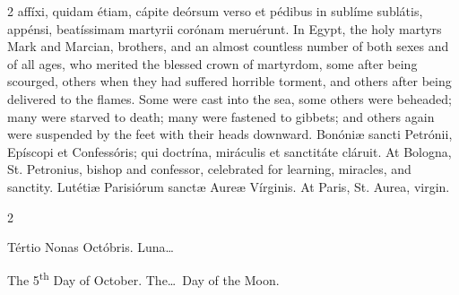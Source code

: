 \begin{paracol}{2}
 affíxi, quidam étiam, cápite deórsum verso et pédibus in sublíme sublátis, 
 appénsi, beatíssimam martyrii corónam meruérunt.
\switchcolumn
{}
In Egypt, the holy martyrs Mark and 
 Marcian, brothers, and an almost countless number of both sexes and of all 
 ages, who merited the blessed crown of martyrdom, some after being scourged, 
 others when they had suffered horrible torment, and others after being 
 delivered to the flames. Some were cast into the sea, some others were 
 beheaded; many were starved to death; many were fastened to gibbets; and 
 others again were suspended by the feet with their heads downward.
\switchcolumn*
{}
Bonóniæ sancti Petrónii, 
 Epíscopi et Confessóris; qui doctrína, miráculis et sanctitáte cláruit.
\switchcolumn
{}
At Bologna, St. Petronius, bishop 
 and confessor, celebrated for learning, miracles, and sanctity.
\switchcolumn*
{}
Lutétiæ Parisiórum 
 sanctæ Aureæ Vírginis.
\switchcolumn
{}
At Paris, St. Aurea, virgin.
\switchcolumn*
{}
\end{paracol}


\begin{paracol}{2}
\begin{center}{\color{gregoriocolor} Tértio Nonas Octóbris. 
 Luna\dots\ }\end{center}
\switchcolumn
{}
\begin{center}{\color{gregoriocolor} The   5\textsuperscript{th} Day of 
 October. The\dots\ Day of the Moon.}\end{center}
\end{paracol}

